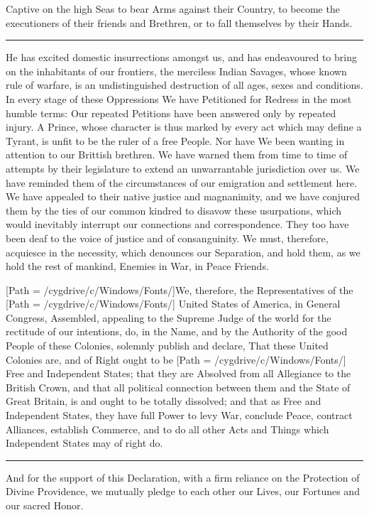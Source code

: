 \documentclass{article}
\begin{document}
Captive on the high Seas to bear Arms against their Country, to become the executioners of their friends and Brethren, or to fall themselves by their Hands.\rule[.5ex]{2em}{.2pt}He has excited domestic insurrections amongst us, and has endeavoured to bring on the inhabitants of our frontiers, the merciless Indian Savages, whose known rule of warfare, is an undistinguished destruction of all ages, sexes and conditions.
In every stage of these Oppressions We have Petitioned for Redress in the most humble terms: Our repeated Petitions have been answered only by repeated injury. A Prince, whose character is thus marked by every act which may define a Tyrant, is unfit to be the ruler of a free People. Nor have We been wanting in attention to our Brittish brethren. We have warned them from time to time of attempts by their legislature to extend an unwarrantable jurisdiction over us. We have reminded them of the circumstances of our emigration and settlement here. We have appealed to their native justice and magnanimity, and we have conjured them by the ties of our common kindred to disavow these usurpations, which would inevitably interrupt our connections and correspondence. They too have been deaf to the voice of justice and of consanguinity. We must, therefore, acquiesce in the necessity, which denounces our Separation, and hold them, as we hold the rest of mankind, Enemies in War, in Peace Friends.

[Path = /cygdrive/c/Windows/Fonts/]We, therefore, \rmfamily the Representatives of the [Path = /cygdrive/c/Windows/Fonts/] United States of America, \rmfamily in General Congress, Assembled, appealing to the Supreme Judge of the world for the rectitude of our intentions, do, in the Name, and by the Authority of the good People of these Colonies, solemnly publish and declare, That these United Colonies are, and of Right ought to be [Path = /cygdrive/c/Windows/Fonts/] Free and Independent States; \rmfamily that they are Absolved from all Allegiance to the British Crown, and that all political connection between them and the State of Great Britain, is and ought to be totally dissolved; and that as Free and Independent States, they have full Power to levy War, conclude Peace, contract Alliances, establish Commerce, and to do all other Acts and Things which Independent States may of right do.\rule[.5ex]{2em}{.2pt}And for the support of this Declaration, with a firm reliance on the Protection of Divine Providence, we mutually pledge to each other our Lives, our Fortunes and our sacred Honor.
\end{document}
